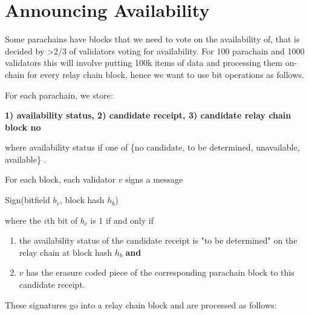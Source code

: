 \section{Announcing Availability}\label{sect-voting-on-availability}

Some parachains have blocks that we need to vote on the availability of, that is decided by >2/3 of validators voting for availability. For 100 parachain and 1000 validators this will involve putting 100k items of data and processing them on-chain for every relay chain block, hence we want to use bit operations as follows.

For each parachain, we store:

\textbf{1) availability status, 2) candidate receipt, 3) candidate relay chain block no}

where availability status if one of \{no candidate, to be determined, unavailable, available\} .

For each block, each validator $v$ signs a message

Sign(bitfield $b_v$, block hash $h_b$)

where the $i$th bit of $b_v$ is $1$ if and only if 

\begin{enumerate}
\item the availability status of the candidate receipt is "to be determined" on the relay chain at block hash $h_b$ \textbf{and}

\item $v$ has the erasure coded piece of the corresponding parachain block to this candidate receipt.
\end{enumerate}

These signatures go into a relay chain block and are processed as follows:

